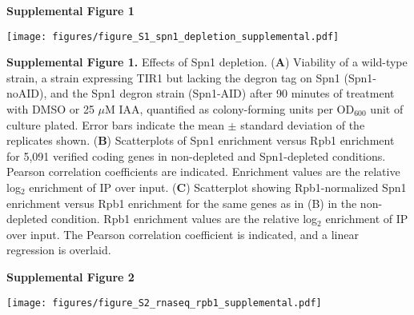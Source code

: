 \documentclass[8pt]{extarticle}
\begin{document}
\textbf{\large Supplemental Figure 1}

{\texttt{[image: figures/figure\_S1\_spn1\_depletion\_supplemental.pdf]}\par}

\vspace{2em}
\textbf{Supplemental Figure 1.} Effects of Spn1 depletion.
(\textbf{A}) Viability of a wild-type strain, a strain expressing TIR1 but lacking the degron tag on Spn1 (Spn1-noAID), and the Spn1 degron strain (Spn1-AID) after 90 minutes of treatment with DMSO or 25 $\mu$M IAA, quantified as colony-forming units per OD$_{600}$ unit of culture plated.
Error bars indicate the mean $\pm$ standard deviation of the replicates shown.
(\textbf{B}) Scatterplots of Spn1 enrichment versus Rpb1 enrichment for 5,091 verified coding genes in non-depleted and Spn1-depleted conditions.
Pearson correlation coefficients are indicated.
Enrichment values are the relative log$_2$ enrichment of IP over input.
(\textbf{C}) Scatterplot showing Rpb1-normalized Spn1 enrichment versus Rpb1 enrichment for the same genes as in (B) in the non-depleted condition.
Rpb1 enrichment values are the relative log$_2$ enrichment of IP over input.
The Pearson correlation coefficient is indicated, and a linear regression is overlaid.

\newpage

\textbf{\large Supplemental Figure 2}

{\texttt{[image: figures/figure\_S2\_rnaseq\_rpb1\_supplemental.pdf]}\par}
\end{document}
